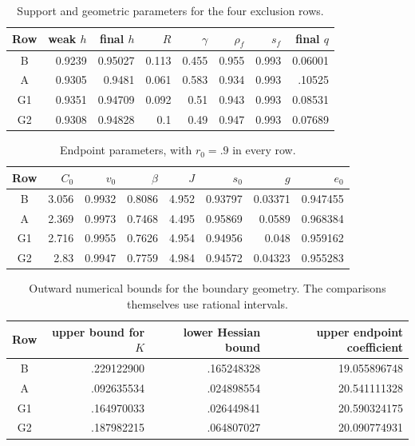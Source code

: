 \documentclass[11pt,reqno]{amsart}
\numberwithin{equation}{section}
\theoremstyle{definition}
\theoremstyle{remark}
\begin{document}
\begin{table}[ht]
\centering\small
\caption{Support and geometric parameters for the four exclusion rows.}
\label{bc:geometry-table}
\begin{tabular}{@{}crrrrrrr@{}}\toprule
Row&weak $h$&final $h$&$R$&$\gamma$&$\rho_f$&$s_f$&final $q$\\\midrule
B & 0.9239 & 0.95027 & 0.113 & 0.455 & 0.955 & 0.993 & 0.06001\\
A & 0.9305 & 0.9481 & 0.061 & 0.583 & 0.934 & 0.993 & .10525\\
G1 & 0.9351 & 0.94709 & 0.092 & 0.51 & 0.943 & 0.993 & 0.08531\\
G2 & 0.9308 & 0.94828 & 0.1 & 0.49 & 0.947 & 0.993 & 0.07689\\
\bottomrule\end{tabular}
\end{table}
\begin{table}[ht]
\centering\small
\caption{Endpoint parameters, with $r_0=.9$ in every row.}
\label{bc:endpoint-table}
\begin{tabular}{@{}crrrrrrr@{}}\toprule
Row&$C_0$&$v_0$&$\beta$&$J$&$s_0$&$g$&$e_0$\\\midrule
B & 3.056 & 0.9932 & 0.8086 & 4.952 & 0.93797 & 0.03371 & 0.947455\\
A & 2.369 & 0.9973 & 0.7468 & 4.495 & 0.95869 & 0.0589 & 0.968384\\
G1 & 2.716 & 0.9955 & 0.7626 & 4.954 & 0.94956 & 0.048 & 0.959162\\
G2 & 2.83 & 0.9947 & 0.7759 & 4.984 & 0.94572 & 0.04323 & 0.955283\\
\bottomrule\end{tabular}
\end{table}
\begin{table}[ht]
\centering\small
\caption{Outward numerical bounds for the boundary geometry.
The comparisons themselves use rational intervals.}
\label{bc:boundary-margins}
\begin{tabular}{@{}crrr@{}}\toprule
Row&upper bound for $K$&lower Hessian bound&upper endpoint coefficient\\\midrule
B&.229122900&.165248328&19.055896748\\
A&.092635534&.024898554&20.541111328\\
G1&.164970033&.026449841&20.590324175\\
G2&.187982215&.064807027&20.090774931\\\bottomrule
\end{tabular}
\end{table}
\end{document}

